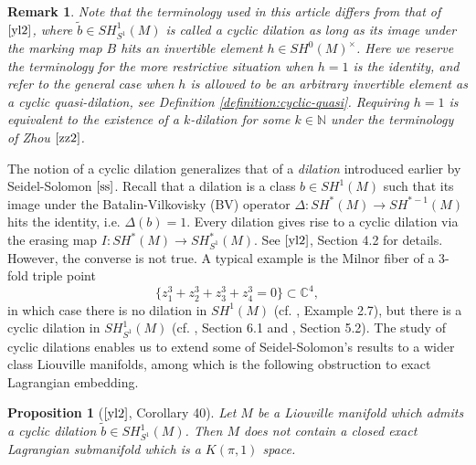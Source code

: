 \documentclass[a4paper]{article}
\newtheorem{proposition}[theorem]{Proposition}
\newtheorem{remark}[theorem]{Remark}
\numberwithin{equation}{section}
\begin{document}
\begin{remark}
Note that the terminology used in this article differs from that of $\cite{yl2}$, where $\tilde{b}\in\mathit{SH}_{S^1}^1(M)$ is called a cyclic dilation as long as its image under the marking map $B$ hits an invertible element $h\in\mathit{SH}^0(M)^\times$. Here we reserve the terminology for the more restrictive situation when $h=1$ is the identity, and refer to the general case when $h$ is allowed to be an arbitrary invertible element as a cyclic quasi-dilation, see Definition \ref{definition:cyclic-quasi}. Requiring $h=1$ is equivalent to the existence of a $k$-dilation for some $k\in\mathbb{N}$ under the terminology of Zhou $\cite{zz2}$.
\end{remark}

The notion of a cyclic dilation generalizes that of a \textit{dilation} introduced earlier by Seidel-Solomon $\cite{ss}$. Recall that a dilation is a class $b\in\mathit{SH}^1(M)$ such that its image under the Batalin-Vilkovisky (BV) operator $\Delta:\mathit{SH}^\ast(M)\rightarrow\mathit{SH}^{\ast-1}(M)$ hits the identity, i.e. $\Delta(b)=1$. Every dilation gives rise to a cyclic dilation via the erasing map $I:\mathit{SH}^\ast(M)\rightarrow\mathit{SH}_{S^1}^\ast(M)$. See $\cite{yl2}$, Section 4.2 for details. However, the converse is not true. A typical example is the Milnor fiber of a 3-fold triple point
\begin{equation}
\{z_1^3+z_2^3+z_3^3+z_4^3=0\}\subset\mathbb{C}^4,
\end{equation}
in which case there is no dilation in $\mathit{SH}^1(M)$ (cf. \cite{ps4}, Example 2.7), but there is a cyclic dilation in $\mathit{SH}_{S^1}^1(M)$ (cf. \cite{yl2}, Section 6.1 and \cite{zz2}, Section 5.2). The study of cyclic dilations enables us to extend some of Seidel-Solomon's results to a wider class Liouville manifolds, among which is the following obstruction to exact Lagrangian embedding.

\begin{proposition}[$\cite{yl2}$, Corollary 40]\label{proposition:aspherical}
Let $M$ be a Liouville manifold which admits a cyclic dilation $\tilde{b}\in\mathit{SH}_{S^1}^1(M)$. Then $M$ does not contain a closed exact Lagrangian submanifold which is a $K(\pi,1)$ space.
\end{proposition}
\end{document}
